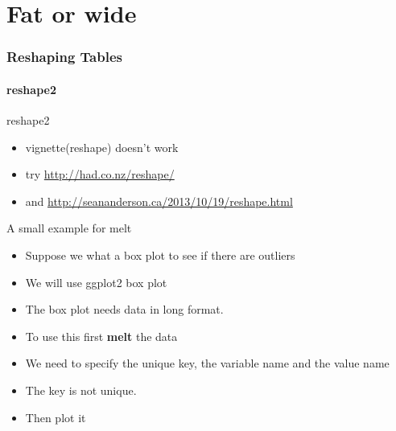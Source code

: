 \documentclass[12pt]{beamer}\usepackage[]{graphicx}\usepackage[]{color}
\begin{document}
\section*{Fat or wide}
\begin{frame}[fragile]
  \frametitle{Reshaping Tables}
  \framesubtitle{reshape2}
  \begin{block}{reshape2}
  \begin{itemize}
 \item vignette(reshape) doesn't work
 \item try \url{http://had.co.nz/reshape/}
  \item and \url{http://seananderson.ca/2013/10/19/reshape.html}
  \end{itemize}
  \end{block}
  \begin{block}{A small example for melt}
  \begin{itemize}
  \item Suppose we what a box plot to see if there are outliers
  \item We will use ggplot2 box plot
  \item The box plot needs data in long format. 
  \item To use this first {\bf melt} the data
  \item We need to specify the unique key, the variable name and the value name
  \item The key is not unique.
  \item Then plot it
  \end{itemize}
  \end{block}
\end{frame}  
  
\end{document}
